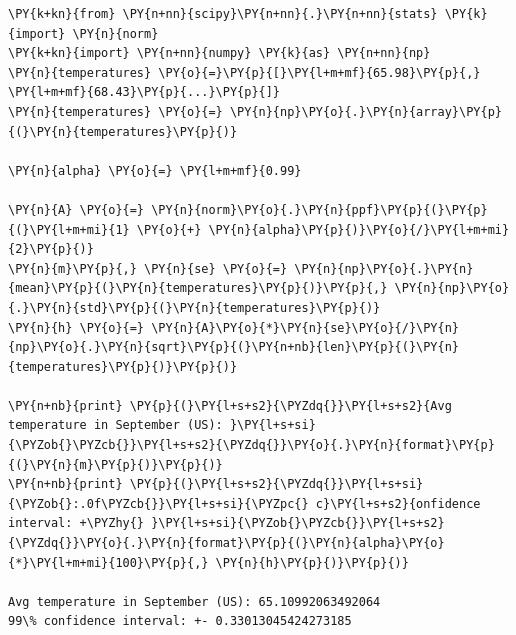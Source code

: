 \begin{Answer}
\begin{tcolorbox}[breakable, size=fbox, boxrule=1pt, pad at break*=1mm,colback=cellbackground, colframe=cellborder]
\begin{Verbatim}[commandchars=\\\{\}]
\PY{k+kn}{from} \PY{n+nn}{scipy}\PY{n+nn}{.}\PY{n+nn}{stats} \PY{k}{import} \PY{n}{norm}
\PY{k+kn}{import} \PY{n+nn}{numpy} \PY{k}{as} \PY{n+nn}{np}
\PY{n}{temperatures} \PY{o}{=}\PY{p}{[}\PY{l+m+mf}{65.98}\PY{p}{,} \PY{l+m+mf}{68.43}\PY{p}{...}\PY{p}{]}
\PY{n}{temperatures} \PY{o}{=} \PY{n}{np}\PY{o}{.}\PY{n}{array}\PY{p}{(}\PY{n}{temperatures}\PY{p}{)}

\PY{n}{alpha} \PY{o}{=} \PY{l+m+mf}{0.99}

\PY{n}{A} \PY{o}{=} \PY{n}{norm}\PY{o}{.}\PY{n}{ppf}\PY{p}{(}\PY{p}{(}\PY{l+m+mi}{1} \PY{o}{+} \PY{n}{alpha}\PY{p}{)}\PY{o}{/}\PY{l+m+mi}{2}\PY{p}{)}
\PY{n}{m}\PY{p}{,} \PY{n}{se} \PY{o}{=} \PY{n}{np}\PY{o}{.}\PY{n}{mean}\PY{p}{(}\PY{n}{temperatures}\PY{p}{)}\PY{p}{,} \PY{n}{np}\PY{o}{.}\PY{n}{std}\PY{p}{(}\PY{n}{temperatures}\PY{p}{)}
\PY{n}{h} \PY{o}{=} \PY{n}{A}\PY{o}{*}\PY{n}{se}\PY{o}{/}\PY{n}{np}\PY{o}{.}\PY{n}{sqrt}\PY{p}{(}\PY{n+nb}{len}\PY{p}{(}\PY{n}{temperatures}\PY{p}{)}\PY{p}{)}

\PY{n+nb}{print} \PY{p}{(}\PY{l+s+s2}{\PYZdq{}}\PY{l+s+s2}{Avg temperature in September (US): }\PY{l+s+si}{\PYZob{}\PYZcb{}}\PY{l+s+s2}{\PYZdq{}}\PY{o}{.}\PY{n}{format}\PY{p}{(}\PY{n}{m}\PY{p}{)}\PY{p}{)} 
\PY{n+nb}{print} \PY{p}{(}\PY{l+s+s2}{\PYZdq{}}\PY{l+s+si}{\PYZob{}:.0f\PYZcb{}}\PY{l+s+si}{\PYZpc{} c}\PY{l+s+s2}{onfidence interval: +\PYZhy{} }\PY{l+s+si}{\PYZob{}\PYZcb{}}\PY{l+s+s2}{\PYZdq{}}\PY{o}{.}\PY{n}{format}\PY{p}{(}\PY{n}{alpha}\PY{o}{*}\PY{l+m+mi}{100}\PY{p}{,} \PY{n}{h}\PY{p}{)}\PY{p}{)}

Avg temperature in September (US): 65.10992063492064
99\% confidence interval: +- 0.33013045424273185
\end{Verbatim}
\end{tcolorbox}
\end{Answer}

